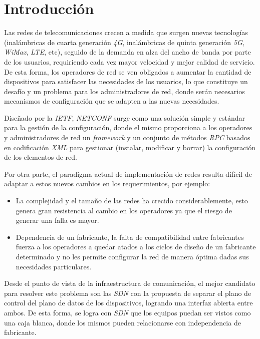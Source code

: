 
\chapter{Introducción} %

\label{Chapter1} %

Las redes de telecomunicaciones crecen a medida que surgen nuevas tecnologías (inalámbricas de cuarta generación \textit{4G}, inalámbricas de quinta generación \textit{5G}, \textit{WiMax}, \textit{LTE}, etc), seguido de la demanda en alza del ancho de banda por parte de los usuarios, requiriendo cada vez mayor velocidad y mejor calidad de servicio. De esta forma, los operadores de red se ven obligados a aumentar la cantidad de dispositivos para satisfacer las necesidades de los usuarios, lo que constituye un desafío y un problema para los administradores de red, donde serán necesarios mecanismos de configuración que se adapten a las nuevas necesidades. 

Diseñado por la \textit{IETF}, \textit{NETCONF} surge como una solución simple y estándar para la gestión de la configuración, donde el mismo proporciona a los operadores y administradores de red un \textit{framework} y un conjunto de métodos \textit{RPC} basados en codificación \textit{XML} para gestionar (instalar, modificar y borrar) la configuración de los elementos de red.

Por otra parte, el paradigma actual de implementación de redes resulta difícil de adaptar a estos nuevos cambios en los requerimientos, por ejemplo:

\begin{itemize}     
    \item La complejidad y el tamaño de las redes ha crecido considerablemente, esto genera gran resistencia al cambio en los operadores ya que el riesgo de generar una falla es mayor.

    \item Dependencia  de  un  fabricante,  la  falta  de  compatibilidad  entre  fabricantes fuerza a los operadores a quedar atados a los ciclos de diseño de un fabricante determinado y no les permite configurar la red de manera óptima dadas sus necesidades particulares. 
\end{itemize}

Desde el punto de vista de la infraestructura de comunicación, el mejor candidato para resolver este problema son las \textit{SDN} con la propuesta de separar el plano de control del plano de datos de los dispositivos, logrando una interfaz abierta entre ambos. De esta forma, se logra con \textit{SDN} que los equipos puedan ser vistos como una caja blanca, donde los mismos pueden relacionarse con independencia de fabricante. 


